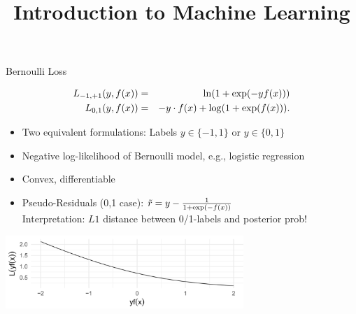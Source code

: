 




\newcommand{\titlefigure}{figure_man/optimization_steps.jpeg}
\newcommand{\learninggoals}{
  \item Know the Bernoulli loss and related losses (Log loss, logistic loss, Binomial loss)
  \item Derive the risk minimizer
  \item Derive the optimal constant model 
}

\title{Introduction to Machine Learning}
\date{}








\begin{vbframe}{Bernoulli Loss}

\vspace*{-0.5cm}
\begin{eqnarray*}
  L_{-1, +1}(y, f(x)) &=& \ln(1+\exp(-yf(x))) \\
  L_{0, 1}(y, f(x)) &=& - y \cdot f(x) + \log(1 + \exp(f(x))). 
\end{eqnarray*}

\begin{itemize}
  \item Two equivalent formulations: Labels $y \in \{-1, 1\}$ or $y \in \{0, 1\}$
  \item Negative log-likelihood of Bernoulli model, e.g., logistic regression
  \item Convex, differentiable
  \item Pseudo-Residuals (0,1 case): $\tilde{r} = y - \frac{1}{1+\exp(-f(x))}$\\   
    Interpretation: $L1$ distance between 0/1-labels and posterior prob!
\end{itemize}

\vspace{0.2cm}
\begin{center}
\includegraphics[width = 9cm ]{figure_man/bernoulli.png} \\
\end{center}

\end{vbframe}




